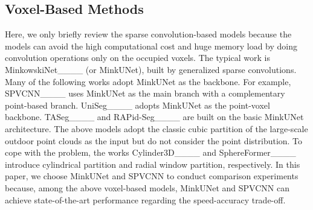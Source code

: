\subsection{Voxel-Based Methods}
Here, we only briefly review the sparse convolution-based models because the models can avoid the high computational cost and huge memory load by doing convolution operations only on the occupied voxels. The typical work is MinkowskiNet____ (or MinkUNet), built by generalized sparse convolutions. Many of the following works adopt MinkUNet as the backbone. For example, SPVCNN____ uses MinkUNet as the main branch with a complementary point-based branch. UniSeg____ adopts MinkUNet as the point-voxel backbone. TASeg____ and RAPid-Seg____ are built on the basic MinkUNet architecture. The above models adopt the classic cubic partition of the large-scale outdoor point clouds as the input but do not consider the point distribution. To cope with the problem, the works Cylinder3D____ and SphereFormer____ introduce cylindrical partition and radial window partition, respectively. In this paper, we choose MinkUNet and SPVCNN to conduct comparison experiments because, among the above voxel-based models, MinkUNet and SPVCNN can achieve state-of-the-art performance regarding the speed-accuracy trade-off.


